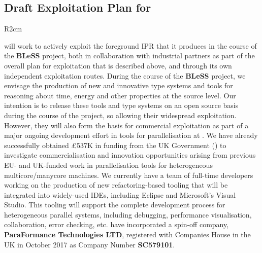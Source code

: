 \documentclass[a4paper,11pt]{article}
\newcommand{\project}[1]{\textbf{#1}\xspace}
\newcommand{\BLESS}{\project{BLeSS}}
\newcommand{\TheProject}{\BLESS}
\begin{document}
\horizontalline

\subsection*{Draft Exploitation Plan for \SAshort{}}

\begin{wrapfigure}{R}{2cm}
\vspace{-1.4cm}
\hfill {}
\vspace{-0.9cm}
\end{wrapfigure}

\SAshort{} will work to actively exploit the foreground IPR that it
produces in the course of the \TheProject{} project, both in
collaboration with industrial partners as part of the overall plan for
exploitation that is described above, and through its own independent exploitation
routes. 
During the course of the \TheProject{} project,
we envisage the production of new and innovative type systems and tools for
reasoning about time, energy and other properties at the source level.
Our intention is to release these tools and type systems on an open source basis during
the course of the project, so allowing their widespread exploitation.
However, they will also form the basis for commercial exploitation as part of a major
ongoing development effort in tools for parallelisation at \SAshort{}.
%
We have already successfully obtained \pounds{537K} in funding from the UK
Government (\paraphrasing{}) to investigate commercialisation and
innovation opportunities arising from previous EU- and UK-funded work
in parallelisation tools for heterogeneous multicore/manycore
machines.  We currently have a team of full-time developers working on the production of new refactoring-based tooling
that will be integrated into widely-used IDEs, including Eclipse and Microsoft's Visual Studio.
This tooling will support the complete development process for heterogeneous parallel systems,
including debugging, performance visualisation, collaboration, error checking, etc.
\SAshort{} have incorporated a spin-off company, \textbf{ParaFormance Technologies LTD}, registered with Companies House in the UK in October 2017 as Company Number \textbf{SC579101}. 
\end{document}
